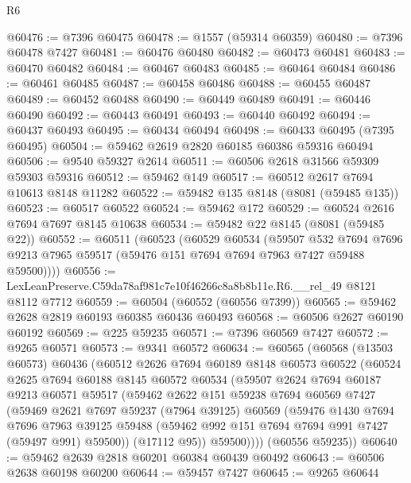 \begin{lexlean}{R6}
\begin{coremodule}
@60476 := @7396 @60475
@60478 := @1557 (@59314 @60359)
@60480 := @7396 @60478 @7427
@60481 := @60476 @60480
@60482 := @60473 @60481
@60483 := @60470 @60482
@60484 := @60467 @60483
@60485 := @60464 @60484
@60486 := @60461 @60485
@60487 := @60458 @60486
@60488 := @60455 @60487
@60489 := @60452 @60488
@60490 := @60449 @60489
@60491 := @60446 @60490
@60492 := @60443 @60491
@60493 := @60440 @60492
@60494 := @60437 @60493
@60495 := @60434 @60494
@60498 := @60433 @60495 (@7395 @60495)
@60504 := @59462 @2619 @2820 @60185 @60386 @59316 @60494
@60506 := @9540 @59327 @2614
@60511 := @60506 @2618 @31566 @59309 @59303 @59316
@60512 := @59462 @149
@60517 := @60512 @2617 @7694 @10613 @8148 @11282
@60522 := @59482 @135 @8148 (@8081 (@59485 @135))
@60523 := @60517 @60522
@60524 := @59462 @172
@60529 := @60524 @2616 @7694 @7697 @8145 @10638
@60534 := @59482 @22 @8145 (@8081 (@59485 @22))
@60552 := @60511
    (@60523
      (@60529
        @60534
        (@59507
          @532
          @7694
          @7696
          @9213
          @7965
          @59517
          (@59476 @151 @7694 @7694 @7963 @7427 @59488 @59500))))
@60556 := LexLeanPreserve.C59da78af981c7e10f46266c8a8b8b11e.R6.__rel_49 @8121 @8112 @7712
@60559 := @60504 (@60552 (@60556 @7399))
@60565 := @59462 @2628 @2819 @60193 @60385 @60436 @60493
@60568 := @60506 @2627 @60190 @60192
@60569 := @225 @59235
@60571 := @7396 @60569 @7427
@60572 := @9265 @60571
@60573 := @9341 @60572
@60634 := @60565
    (@60568
      (@13503 @60573)
      @60436
      (@60512
        @2626
        @7694
        @60189
        @8148
        @60573
        @60522
        (@60524
          @2625
          @7694
          @60188
          @8145
          @60572
          @60534
          (@59507
            @2624
            @7694
            @60187
            @9213
            @60571
            @59517
            (@59462
              @2622
              @151
              @59238
              @7694
              @60569
              @7427
              (@59469
                @2621
                @7697
                @59237
                (@7964 @39125)
                @60569
                (@59476
                  @1430
                  @7694
                  @7696
                  @7963
                  @39125
                  @59488
                  (@59462 @992 @151 @7694 @7694 @991 @7427 (@59497 @991) @59500))
                (@17112 @95))
              @59500))))
      (@60556 @59235))
@60640 := @59462 @2639 @2818 @60201 @60384 @60439 @60492
@60643 := @60506 @2638 @60198 @60200
@60644 := @59457 @7427
@60645 := @9265 @60644

\end{coremodule}
\end{lexlean}
